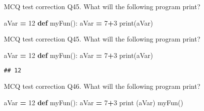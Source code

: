 \documentclass[
  8pt,
  ignorenonframetext,
]{beamer}
\newenvironment{Shaded}{\begin{snugshade}}{\end{snugshade}}
\newcommand{\BuiltInTok}[1]{#1}
\newcommand{\DecValTok}[1]{\textcolor[rgb]{0.00,0.00,0.81}{#1}}
\newcommand{\KeywordTok}[1]{\textcolor[rgb]{0.13,0.29,0.53}{\textbf{#1}}}
\newcommand{\NormalTok}[1]{#1}
\newcommand{\OperatorTok}[1]{\textcolor[rgb]{0.81,0.36,0.00}{\textbf{#1}}}
\begin{document}
\begin{frame}[fragile]{MCQ test correction}
\protect\hypertarget{mcq-test-correction-88}{}
Q45. What will the following program print?

\begin{Shaded}
\begin{Highlighting}[]
\NormalTok{aVar }\OperatorTok{=} \DecValTok{12}
\KeywordTok{def}\NormalTok{ myFun():}
\NormalTok{    aVar }\OperatorTok{=} \DecValTok{7}\OperatorTok{+}\DecValTok{3}
\BuiltInTok{print}\NormalTok{(aVar)}
\end{Highlighting}
\end{Shaded}
\end{frame}

\begin{frame}[fragile]{MCQ test correction}
\protect\hypertarget{mcq-test-correction-89}{}
Q45. What will the following program print?

\begin{Shaded}
\begin{Highlighting}[]
\NormalTok{aVar }\OperatorTok{=} \DecValTok{12}
\KeywordTok{def}\NormalTok{ myFun():}
\NormalTok{    aVar }\OperatorTok{=} \DecValTok{7}\OperatorTok{+}\DecValTok{3}
\BuiltInTok{print}\NormalTok{(aVar)}
\end{Highlighting}
\end{Shaded}

\begin{verbatim}
## 12
\end{verbatim}
\end{frame}

\begin{frame}[fragile]{MCQ test correction}
\protect\hypertarget{mcq-test-correction-90}{}
Q46. What will the following program print?

\begin{Shaded}
\begin{Highlighting}[]
\NormalTok{aVar }\OperatorTok{=} \DecValTok{12}
\KeywordTok{def}\NormalTok{ myFun():}
\NormalTok{    aVar }\OperatorTok{=} \DecValTok{7}\OperatorTok{+}\DecValTok{3}
\BuiltInTok{print}\NormalTok{ (aVar)}
\NormalTok{myFun()}
\end{Highlighting}
\end{Shaded}
\end{frame}
\end{document}
